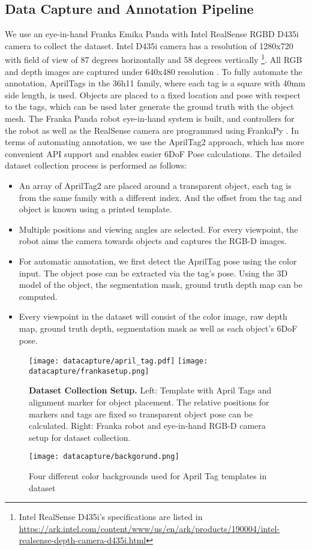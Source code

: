 \subsection{Data Capture and Annotation Pipeline }
We use an eye-in-hand Franka Emika Panda with Intel RealSense RGBD D435i camera to collect the dataset. Intel D435i camera has a resolution of 1280x720 with field of view of 87 degrees horizontally and 58 degrees vertically \footnote{Intel RealSense D435i's specifications are listed in \url{https://ark.intel.com/content/www/us/en/ark/products/190004/intel-realsense-depth-camera-d435i.html}  }. All RGB and depth images are captured under 640x480 resolution . To fully automate the annotation, AprilTags in the 36h11 family, where each tag is a square with 40mm side length, is used. Objects are placed to a fixed location and pose with respect to the tags, which can be used later generate the ground truth with the object mesh. The Franka Panda robot eye-in-hand system is built, and controllers for the robot as well as the RealSense camera are programmed using FrankaPy \cite{frankapy}. In terms of automating annotation, we use the AprilTag2 \cite{apriltag2} approach, which has more convenient API support and enables easier 6DoF Pose calculations. The detailed dataset collection process is performed as follows:
\begin{itemize}
    \item An array of AprilTag2 are placed around a transparent object, each tag is from the same family with a different index. And the offset from the tag and object is known using a printed template.
    \item Multiple positions and viewing angles are selected. For every viewpoint, the robot aims the camera towards objects and captures the RGB-D images.
    \item  For automatic annotation, we first detect the AprilTag pose using the color input. The object pose can be extracted via the tag's pose. Using the 3D model of the object, the segmentation mask, ground truth depth map can be computed. 
    \item Every viewpoint in the dataset will consist of the color image, raw depth map, ground truth depth, segmentation mask as well as each object's 6DoF pose.
\end{itemize}
\begin{figure}[h]
    \centering
    \texttt{[image: datacapture/april\_tag.pdf]}
    \texttt{[image: datacapture/frankasetup.png]}
    \caption{\textbf{Dataset Collection Setup.} Left: Template with April Tags and alignment marker for object placement. The relative positions for markers and tags are fixed so transparent object pose can be calculated. Right: Franka robot and eye-in-hand RGB-D camera setup for dataset collection.}
    \label{fig:my_label}
\end{figure}
\begin{figure}
    \centering
    \texttt{[image: datacapture/backgorund.png]}
    \caption{Four different color backgrounds used for April Tag templates in \dataName dataset }
    \label{fig:my_label}
\end{figure}




